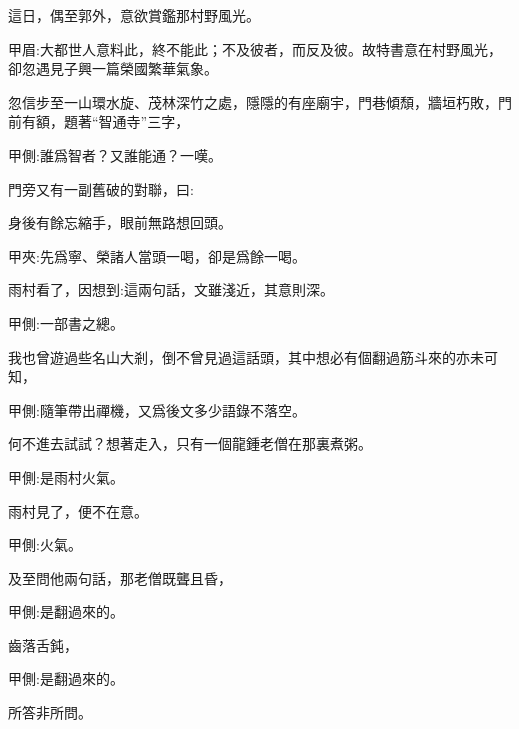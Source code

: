 \begin{parag}
    這日，偶至郭外，意欲賞鑑那村野風光。\begin{note}甲眉:大都世人意料此，終不能此；不及彼者，而反及彼。故特書意在村野風光，卻忽遇見子興一篇榮國繁華氣象。\end{note}忽信步至一山環水旋、茂林深竹之處，隱隱的有座廟宇，門巷傾頹，牆垣朽敗，門前有額，題著“智通寺”三字，\begin{note}甲側:誰爲智者？又誰能通？一嘆。\end{note}門旁又有一副舊破的對聯，曰:
\end{parag}


\begin{poem}
    \begin{pl}身後有餘忘縮手，眼前無路想回頭。\end{pl}\begin{note}甲夾:先爲寧、榮諸人當頭一喝，卻是爲餘一喝。\end{note}
\end{poem}


\begin{parag}
    雨村看了，因想到:這兩句話，文雖淺近，其意則深。\begin{note}甲側:一部書之總。\end{note}我也曾遊過些名山大剎，倒不曾見過這話頭，其中想必有個翻過筋斗來的亦未可知，\begin{note}甲側:隨筆帶出禪機，又爲後文多少語錄不落空。\end{note}何不進去試試？想著走入，只有一個龍鍾老僧在那裏煮粥。\begin{note}甲側:是雨村火氣。\end{note}雨村見了，便不在意。\begin{note}甲側:火氣。\end{note}及至問他兩句話，那老僧既聾且昏，\begin{note}甲側:是翻過來的。\end{note}齒落舌鈍，\begin{note}甲側:是翻過來的。\end{note}所答非所問。
\end{parag}


